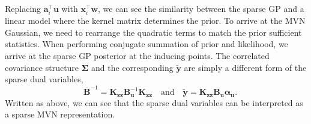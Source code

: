 \documentclass{article}
\newcommand{\mathbold}[1]{\bm{#1}}
\newcommand{\mbf}[1]{\mathbf{#1}}
\newcommand{\MB}{\mbf{B}}
\newcommand{\valpha}[0]{\mathbold{\alpha}}
\newcommand{\vu}{\mbf{u}}
\newcommand{\vx}{\mbf{x}}
\newcommand{\vy}{\mbf{y}}
\newcommand{\vw}{\mbf{w}}
\newcommand{\va}{\mbf{a}}
\newcommand{\MKzz}{\mbf{K}_{\mbf{z}\mbf{z}}}
\newcommand{\MSigma}[0]{\mathbold{\Sigma}}
\begin{document}
Replacing $\va_i^\top \vu$ with $\vx_i^{\top}\vw$, we can see the similarity between the sparse GP and a linear model where the kernel matrix determines the prior. To arrive at the MVN Gaussian, we need to rearrange the quadratic terms to match the prior sufficient statistics. When performing conjugate summation of prior and likelihood, we arrive at the sparse GP posterior at the inducing points. The correlated covariance structure $\MSigma$ and the corresponding $\tilde{\vy}$ are simply a different form of the sparse dual variables,
\begin{equation}
\quad \bar{\MB}^{-1} =  \MKzz \MB_\vu^{-1} \MKzz \quad \text{and} \quad \tilde{\vy} = \MKzz \MB_{\vu}\valpha_{\vu}.
\end{equation}
Written as above, we can see that the sparse dual variables can be interpreted as a sparse MVN representation.
\end{document}
